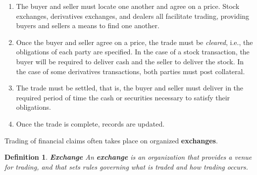 \documentclass[letterpaper,10pt]{article}
\newtheorem{df}{Definition}[section]
\begin{document}
\begin{enumerate}

\item The buyer and seller must locate one another and agree on a price. Stock exchanges, derivatives exchanges, and dealers all facilitate trading, providing buyers and sellers a means to find one another.

\item Once the buyer and seller agree on a price, the trade must be {\em cleared}, i.e., the obligations of each party are specified. In the case of a stock transaction, the buyer will be required to deliver cash and the seller to deliver the stock. In the case of some
derivatives transactions, both parties must post collateral.

\item The trade must be settled, that is, the buyer and seller must deliver in the required period of time the cash or securities necessary to satisfy their obligations.

\item Once the trade is complete, records are updated.

\end{enumerate}

Trading of financial claims often takes place on organized {\bf exchanges}. 

\begin{df}{\bf Exchange}
An {\bf exchange} is an organization that provides a venue for trading, and that sets rules governing what is traded and how trading occurs. 
\end{df}
\end{document}
